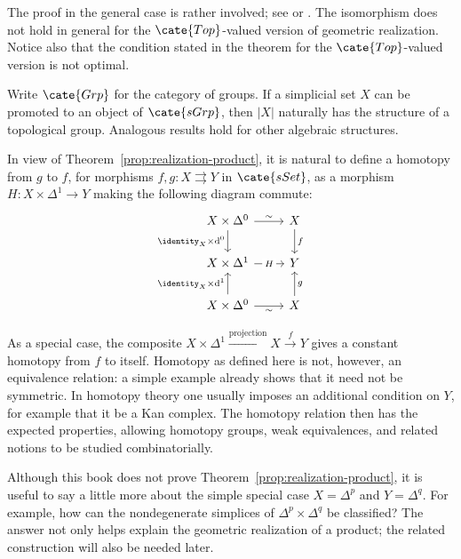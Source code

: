 The proof in the general case is rather involved; see
\cite[Chapter III]{GZ67} or \cite{Dri03}. The isomorphism does not hold in
general for the $\cate{Top}$-valued version of geometric realization. Notice
also that the condition stated in the theorem for the $\cate{Top}$-valued
version is not optimal.

\begin{corollary}
	Write $\cate{Grp}$ for the category of groups. If a simplicial set $X$ can
	be promoted to an object of $\cate{sGrp}$, then $|X|$ naturally has the
	structure of a topological group. Analogous results hold for other
	algebraic structures.
\end{corollary}

In view of Theorem~\ref{prop:realization-product}, it is natural to define a
homotopy from $g$ to $f$, for morphisms $f,g:X\rightrightarrows Y$ in
$\cate{sSet}$, as a morphism $H:X\times\Delta^1\to Y$ making the following
diagram commute:
\begin{equation}\label{eqn:simplicial-homotopy-prep}
	\begin{tikzcd}
		X \times \Delta^0 \arrow[d, "{\identity_X \times \mathrm{d}^0}"'] \arrow[r, "\sim"] & X \arrow[d, "f"] \\
		X \times \Delta^1 \arrow[r, "H" description] & Y \\
		X \times \Delta^0 \arrow[u, "{\identity_X \times \mathrm{d}^1}"] \arrow[r, "\sim"'] & X \arrow[u, "g"']
	\end{tikzcd}
\end{equation}

As a special case, the composite
$X\times\Delta^1\xrightarrow{\text{projection}}X\xrightarrow{f}Y$ gives a
constant homotopy from $f$ to itself. Homotopy as defined here is not,
however, an equivalence relation: a simple example already shows that it need
not be symmetric. In homotopy theory one usually imposes an additional
condition on $Y$, for example that it be a Kan complex. The homotopy relation
then has the expected properties, allowing homotopy groups, weak
equivalences, and related notions to be studied combinatorially.

Although this book does not prove Theorem~\ref{prop:realization-product}, it
is useful to say a little more about the simple special case
$X=\Delta^p$ and $Y=\Delta^q$. For example, how can the nondegenerate
simplices of $\Delta^p\times\Delta^q$ be classified? The answer not only
helps explain the geometric realization of a product; the related
construction will also be needed later.

